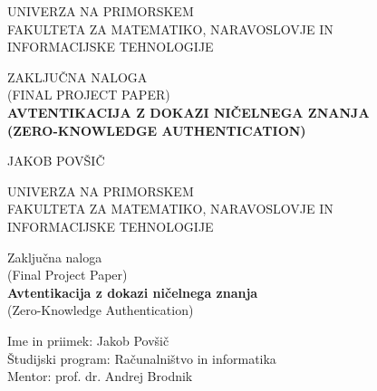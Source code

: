 \pagestyle{empty}
\reversemarginpar
{}

\begin{center}
\vspace{-1cm}
\noindent \large UNIVERZA NA PRIMORSKEM\\
\large FAKULTETA ZA MATEMATIKO, NARAVOSLOVJE IN\\
INFORMACIJSKE TEHNOLOGIJE


\vspace*{\fill}
\large ZAKLJUČNA NALOGA\\
\large (FINAL PROJECT PAPER)\\
\vspace{0.3cm}
\textbf{\Large AVTENTIKACIJA Z DOKAZI NIČELNEGA ZNANJA}\\
\textbf{\Large (ZERO-KNOWLEDGE AUTHENTICATION)}
\vspace*{\fill}
\vspace{1.8cm}
\end{center}


\begin{flushright}
\noindent \large JAKOB POVŠIČ\\
\vspace{2cm}
\end{flushright}

\newpage

\pagestyle{empty}
\begin{center}
\noindent \large UNIVERZA NA PRIMORSKEM\\
\large FAKULTETA ZA MATEMATIKO, NARAVOSLOVJE IN\\
INFORMACIJSKE TEHNOLOGIJE


\normalsize
\vspace{6cm}
Zaključna naloga\\
(Final Project Paper)\\
\textbf{\large Avtentikacija z dokazi ničelnega znanja}\\
\normalsize
(Zero-Knowledge Authentication)\\
\end{center}

\begin{flushleft}
\vspace{5cm}
\noindent Ime in priimek: Jakob Povšič
\\
\noindent Študijski program: Računalništvo in informatika
\\
\noindent Mentor: prof. dr. Andrej Brodnik
\\
\end{flushleft}

